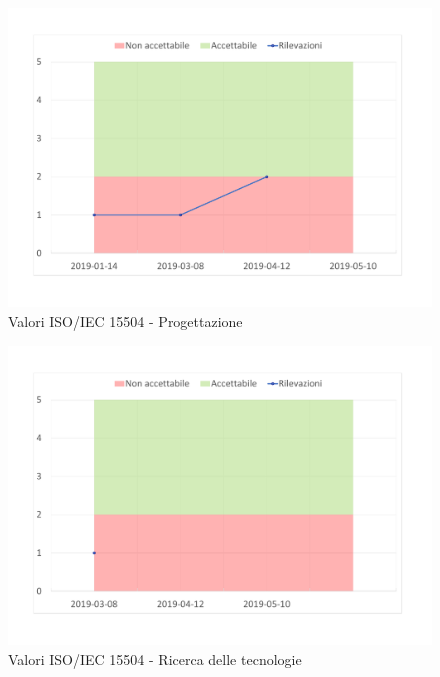 \begin{figure}[H]
	\centering
	\includegraphics[scale=0.6]{images/resoconto/Progettazione.pdf}
	\caption{Valori ISO/IEC 15504 - Progettazione}	
\end{figure}


\begin{figure}[H]
	\centering
	\includegraphics[scale=0.6]{images/resoconto/Ricerca.pdf}
	\caption{Valori ISO/IEC 15504 - Ricerca delle tecnologie}	
\end{figure}


